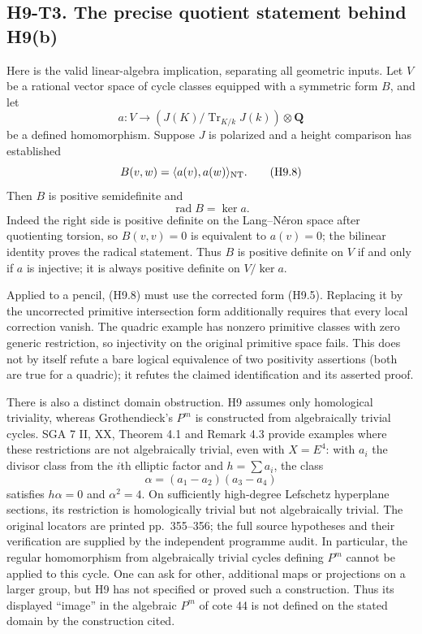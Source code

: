 \subsection*{H9-T3. The precise quotient statement behind H9(b)}

Here is the valid linear-algebra implication, separating all geometric
inputs. Let $V$ be a rational vector space of cycle classes equipped with
a symmetric form $B$, and let
\[
 a:V\longrightarrow
 (J(K)/\operatorname{Tr}_{K/k}J(k))\otimes\mathbf Q
\]
be a defined homomorphism. Suppose $J$ is polarized and a height comparison
has established
\[
 B(v,w)=\langle a(v),a(w)\rangle_{\rm NT}.
                                                        \tag{H9.8}
\]
Then $B$ is positive semidefinite and
\[
 \operatorname{rad}B=\ker a.
\]
Indeed the right side is positive definite on the Lang--N\'eron space
after quotienting torsion, so $B(v,v)=0$ is equivalent to $a(v)=0$; the
bilinear identity proves the radical statement. Thus $B$ is positive
definite on $V$ if and only if $a$ is injective; it is always positive
definite on $V/\ker a$.

Applied to a pencil, (H9.8) must use the corrected form (H9.5). Replacing
it by the uncorrected primitive intersection form additionally requires
that every local correction vanish. The quadric example has nonzero
primitive classes with zero generic restriction, so injectivity on the
original primitive space fails. This does not by itself refute a bare
logical equivalence of two positivity assertions (both are true for a
quadric); it refutes the claimed identification and its asserted proof.

There is also a distinct domain obstruction. H9 assumes only homological
triviality, whereas Grothendieck's $P^m$ is constructed from algebraically
trivial cycles. SGA 7 II, XX, Theorem 4.1 and Remark 4.3 provide examples
where these restrictions are not algebraically trivial, even with
$X=E^4$: with $a_i$ the divisor class from the $i$th elliptic factor and
$h=\sum a_i$, the class
\[
 \alpha=(a_1-a_2)(a_3-a_4)
\]
satisfies $h\alpha=0$ and $\alpha^2=4$. On sufficiently high-degree
Lefschetz hyperplane sections, its restriction is homologically trivial
but not algebraically trivial. The original locators are printed
pp.~355--356; the full source hypotheses and their verification are
supplied by the independent programme audit. In particular, the regular
homomorphism from algebraically trivial cycles defining $P^m$ cannot be
applied to this cycle. One can ask for other, additional maps or
projections on a larger group, but H9 has not specified or proved such a
construction. Thus its displayed ``image'' in the algebraic $P^m$ of
cote 44 is not defined on the stated domain by the construction cited.

